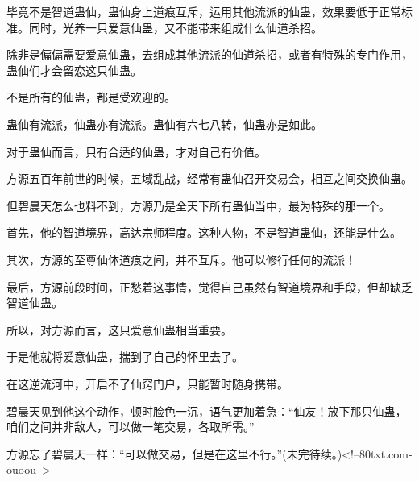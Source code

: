 \begin{this_body}
毕竟不是智道蛊仙，蛊仙身上道痕互斥，运用其他流派的仙蛊，效果要低于正常标准。同时，光养一只爱意仙蛊，又不能带来组成什么仙道杀招。

除非是偏偏需要爱意仙蛊，去组成其他流派的仙道杀招，或者有特殊的专门作用，蛊仙们才会留恋这只仙蛊。

不是所有的仙蛊，都是受欢迎的。

蛊仙有流派，仙蛊亦有流派。蛊仙有六七八转，仙蛊亦是如此。

对于蛊仙而言，只有合适的仙蛊，才对自己有价值。

方源五百年前世的时候，五域乱战，经常有蛊仙召开交易会，相互之间交换仙蛊。

但碧晨天怎么也料不到，方源乃是全天下所有蛊仙当中，最为特殊的那一个。

首先，他的智道境界，高达宗师程度。这种人物，不是智道蛊仙，还能是什么。

其次，方源的至尊仙体道痕之间，并不互斥。他可以修行任何的流派！

最后，方源前段时间，正愁着这事情，觉得自己虽然有智道境界和手段，但却缺乏智道仙蛊。

所以，对方源而言，这只爱意仙蛊相当重要。

于是他就将爱意仙蛊，揣到了自己的怀里去了。

在这逆流河中，开启不了仙窍门户，只能暂时随身携带。

碧晨天见到他这个动作，顿时脸色一沉，语气更加着急：“仙友！放下那只仙蛊，咱们之间并非敌人，可以做一笔交易，各取所需。”

方源忘了碧晨天一样：“可以做交易，但是在这里不行。”(未完待续。)<!--80txt.com-ouoou-->

\end{this_body}

